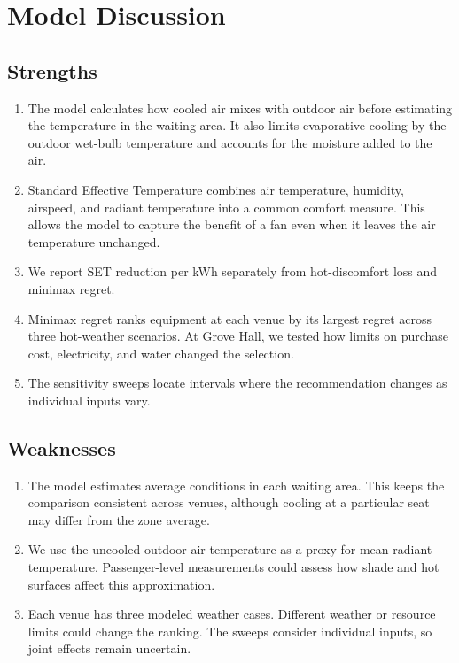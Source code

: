 \section{Model Discussion}

\subsection{Strengths}

\begin{enumerate}
    \item
    The model calculates how cooled air mixes with outdoor air before estimating the temperature in the waiting area. It also limits evaporative cooling by the outdoor wet-bulb temperature and accounts for the moisture added to the air.

    \item
    Standard Effective Temperature combines air temperature, humidity, airspeed, and radiant temperature into a common comfort measure. This allows the model to capture the benefit of a fan even when it leaves the air temperature unchanged.

    \item
    We report SET reduction per kWh separately from hot-discomfort loss and minimax regret.

    \item
    Minimax regret ranks equipment at each venue by its largest regret across three hot-weather scenarios. At Grove Hall, we tested how limits on purchase cost, electricity, and water changed the selection.

    \item
    The sensitivity sweeps locate intervals where the recommendation changes as individual inputs vary.
\end{enumerate}

\subsection{Weaknesses}

\begin{enumerate}
    \item
    The model estimates average conditions in each waiting area. This keeps the comparison consistent across venues, although cooling at a particular seat may differ from the zone average.

    \item
    We use the uncooled outdoor air temperature as a proxy for mean radiant temperature. Passenger-level measurements could assess how shade and hot surfaces affect this approximation.

    \item
    Each venue has three modeled weather cases. Different weather or resource limits could change the ranking. The sweeps consider individual inputs, so joint effects remain uncertain.
\end{enumerate}